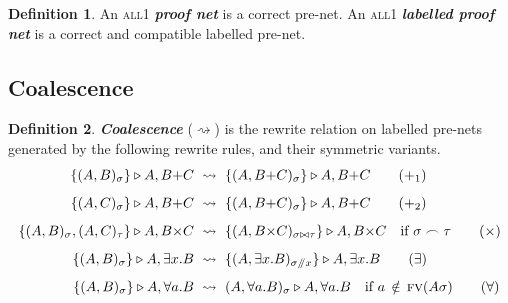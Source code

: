 \documentclass{article}
\theoremstyle{definition}
\newtheorem{definition}{Definition}
\theoremstyle{plain}
\newcommand\defn[1]{\textit{\textbf{#1}}}
\newcommand\all{\textsc{all}}
\newcommand\+{+}
\renewcommand\*{\times}
\newcommand\fv{\textsc{fv}}
\newcommand\net[3]{#1\triangleright #2,#3}
\newcommand\join\bowtie
\newcommand\comp\frown
\newcommand\clink[3][\sigma]{(#2,#3)_{#1}}
\newcommand\minus{\mathop{/\mathchoice{\kern-3pt}{\kern-3pt}{\kern-2.5pt}{\kern-2pt}/}}
\newcommand\coals{\rightsquigarrow}
\newcommand\coal{\coals}%
\begin{document}
\begin{definition}
An \all1 \defn{proof net} is a correct pre-net. An \all1 \defn{labelled proof net} is a correct and compatible labelled pre-net.
\end{definition}


\subsection{Coalescence}

\begin{definition}
\defn{Coalescence} ($\coals$) is the rewrite relation on labelled pre-nets generated by the following rewrite rules, and their symmetric variants.
%
\renewcommand{\+}{{+}}
\renewcommand{\*}{{\times}}
\begin{align}
  	\net{\{\clink AB\}}A{B\+C} 
& ~\coal~
	\net{\{\clink A{B\+C}\}}A{B\+C}
\tag{$\+_1$}
\\[5pt]
        \net{\{\clink AC\}}A{B\+C}
& ~\coal~  
	\net{\{\clink A{B\+C}\}}A{B\+C}
\tag{$\+_2$}
\\[5pt]
	\net{\{\clink AB,\clink[\tau]AC\}}A{B\*C}
& ~\coal~ 
	\net{\{\clink[\sigma\join\tau]A{B\*C}\}}A{B\*C}\quad\text{if }\sigma\comp\tau
\tag{$\*$}
\\[5pt]	
	\net{\{\clink AB\}}A{\exists x.B}
& ~\coal~ 
	\net{\{\clink[\sigma\!\minus\!x]A{\exists x.B}\}}A{\exists x.B}
\tag{$\exists$}
\\[5pt]
	\net{\{\clink AB\}}A{\forall a.B}
& ~\coal~ 
	\net{\clink A{\forall a.B}}A{\forall a.B} \quad \text{if }a\,\notin\,\fv(A\sigma)
\tag{$\forall$}
\end{align}

\end{definition}
\end{document}

